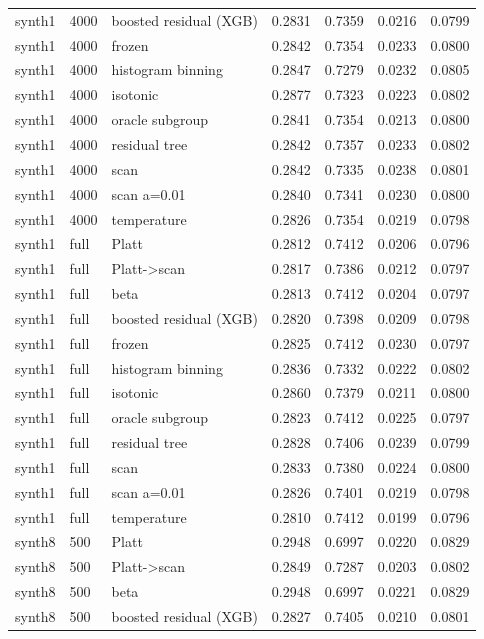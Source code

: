\begin{tabular}{lllrrrr}
synth1 & 4000 & boosted residual (XGB) & 0.2831 & 0.7359 & 0.0216 & 0.0799 \\
synth1 & 4000 & frozen & 0.2842 & 0.7354 & 0.0233 & 0.0800 \\
synth1 & 4000 & histogram binning & 0.2847 & 0.7279 & 0.0232 & 0.0805 \\
synth1 & 4000 & isotonic & 0.2877 & 0.7323 & 0.0223 & 0.0802 \\
synth1 & 4000 & oracle subgroup & 0.2841 & 0.7354 & 0.0213 & 0.0800 \\
synth1 & 4000 & residual tree & 0.2842 & 0.7357 & 0.0233 & 0.0802 \\
synth1 & 4000 & scan & 0.2842 & 0.7335 & 0.0238 & 0.0801 \\
synth1 & 4000 & scan a=0.01 & 0.2840 & 0.7341 & 0.0230 & 0.0800 \\
synth1 & 4000 & temperature & 0.2826 & 0.7354 & 0.0219 & 0.0798 \\
synth1 & full & Platt & 0.2812 & 0.7412 & 0.0206 & 0.0796 \\
synth1 & full & Platt->scan & 0.2817 & 0.7386 & 0.0212 & 0.0797 \\
synth1 & full & beta & 0.2813 & 0.7412 & 0.0204 & 0.0797 \\
synth1 & full & boosted residual (XGB) & 0.2820 & 0.7398 & 0.0209 & 0.0798 \\
synth1 & full & frozen & 0.2825 & 0.7412 & 0.0230 & 0.0797 \\
synth1 & full & histogram binning & 0.2836 & 0.7332 & 0.0222 & 0.0802 \\
synth1 & full & isotonic & 0.2860 & 0.7379 & 0.0211 & 0.0800 \\
synth1 & full & oracle subgroup & 0.2823 & 0.7412 & 0.0225 & 0.0797 \\
synth1 & full & residual tree & 0.2828 & 0.7406 & 0.0239 & 0.0799 \\
synth1 & full & scan & 0.2833 & 0.7380 & 0.0224 & 0.0800 \\
synth1 & full & scan a=0.01 & 0.2826 & 0.7401 & 0.0219 & 0.0798 \\
synth1 & full & temperature & 0.2810 & 0.7412 & 0.0199 & 0.0796 \\
synth8 & 500 & Platt & 0.2948 & 0.6997 & 0.0220 & 0.0829 \\
synth8 & 500 & Platt->scan & 0.2849 & 0.7287 & 0.0203 & 0.0802 \\
synth8 & 500 & beta & 0.2948 & 0.6997 & 0.0221 & 0.0829 \\
synth8 & 500 & boosted residual (XGB) & 0.2827 & 0.7405 & 0.0210 & 0.0801 \\

\end{tabular}
